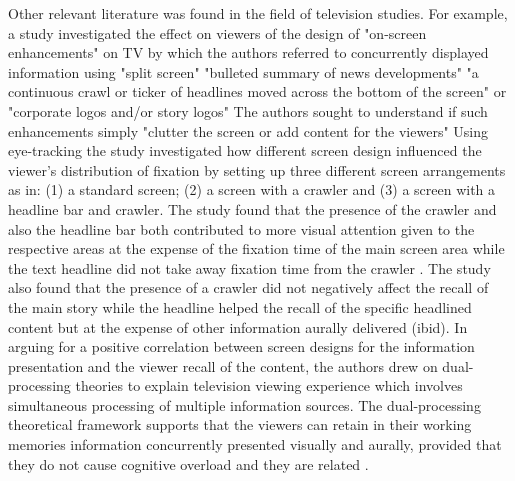 \documentclass[output=paper]{langsci/langscibook}
\begin{document}
Other relevant literature was found in the field of television studies. For example, a study \citep{josephson2006} investigated the effect on viewers of  the design of "on-screen enhancements" on TV by which the authors referred to concurrently displayed information using "split screen" "bulleted summary of news developments" "a continuous crawl or ticker of headlines moved across the bottom of the screen" or "corporate logos and/or story logos"  The authors sought to understand if such enhancements simply "clutter the screen or add content for the viewers" Using eye-tracking the study investigated how different screen design influenced the viewer's distribution of fixation by setting up three different screen arrangements as in: (1) a standard screen; (2) a screen with a crawler and (3) a screen with a headline bar and crawler.  The study found that the presence of the crawler and also the headline bar both contributed to more visual attention given to the respective areas at the expense of the fixation time of the main screen area while the text headline did not take away fixation time from the crawler \citep[pg. 161]{josephson2006}. The study also found that the presence of a crawler did not negatively affect the recall of the main story while the headline helped the recall of the specific headlined content but at the expense of other information aurally delivered (ibid). In arguing for a positive correlation between screen designs for the information presentation and the viewer recall of the content, the authors drew on dual-processing theories to explain television viewing experience which involves simultaneous processing of multiple information sources. The dual-processing theoretical framework supports that the viewers can retain in their working memories information concurrently presented visually and aurally, provided that they do not cause cognitive overload and they are related \citep{Mayer1998}. 
\end{document}
